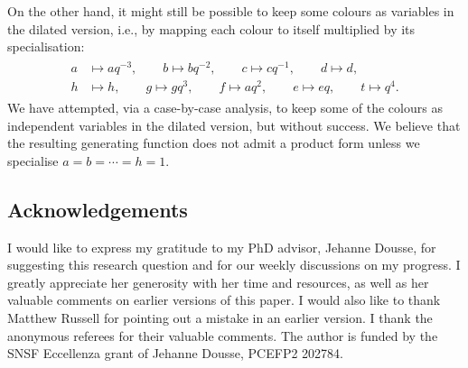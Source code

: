 \documentclass[pdftex]{sigma}
\numberwithin{equation}{section}
\theoremstyle{definition}
\begin{document}
On the other hand, it might still be possible to keep some colours as variables in the dilated version, i.e., by mapping each colour to itself multiplied by its specialisation:
\begin{align*}
\begin{aligned}
 a &\mapsto aq^{-3}, \qquad b \mapsto bq^{-2}, \qquad c \mapsto cq^{-1}, \qquad d \mapsto d, \\
 h &\mapsto h, \qquad g \mapsto gq^{3}, \qquad f \mapsto aq^{2}, \qquad e \mapsto eq, \qquad t \mapsto q^{4}.
\end{aligned}
\end{align*}
We have attempted, via a case-by-case analysis, to keep some of the colours as independent variables in the dilated version, but without success. We believe that the resulting generating function does not admit a product form unless we specialise $a=b=\cdots=h=1$.


\subsection*{Acknowledgements}

I would like to express my gratitude to my PhD advisor, Jehanne Dousse, for suggesting this research question and for our weekly discussions on my progress. I greatly appreciate her generosity with her time and resources, as well as her valuable comments on earlier versions of this paper. I would also like to thank Matthew Russell for pointing out a mistake in an earlier version. I thank the anonymous referees for their valuable comments. The author is funded by the SNSF
Eccellenza grant of Jehanne Dousse, PCEFP2 202784.
\end{document}
